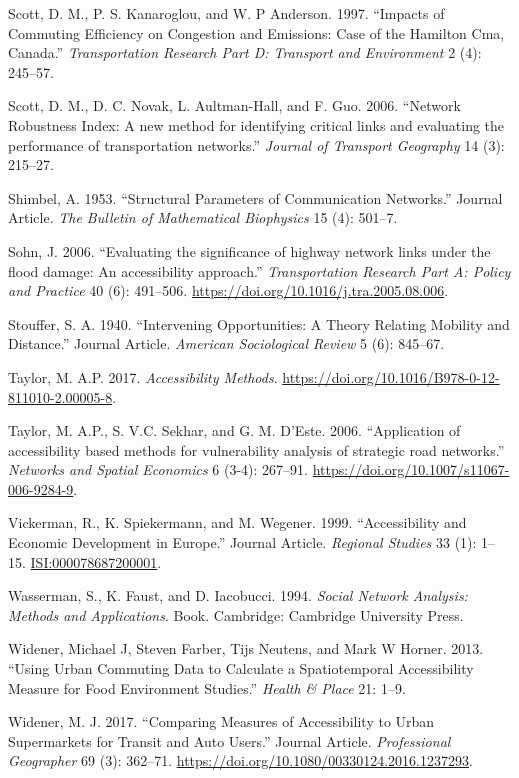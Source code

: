 \documentclass[]{elsarticle} %
\begin{document}
\leavevmode\hypertarget{ref-Scott1997impacts}{}%
Scott, D. M., P. S. Kanaroglou, and W. P Anderson. 1997. ``Impacts of
Commuting Efficiency on Congestion and Emissions: Case of the Hamilton
Cma, Canada.'' \emph{Transportation Research Part D: Transport and
Environment} 2 (4): 245--57.

\leavevmode\hypertarget{ref-Scott2006}{}%
Scott, D. M., D. C. Novak, L. Aultman-Hall, and F. Guo. 2006. ``Network
Robustness Index: A new method for identifying critical links and
evaluating the performance of transportation networks.'' \emph{Journal
of Transport Geography} 14 (3): 215--27.

\leavevmode\hypertarget{ref-Shimbel1953}{}%
Shimbel, A. 1953. ``Structural Parameters of Communication Networks.''
Journal Article. \emph{The Bulletin of Mathematical Biophysics} 15 (4):
501--7.

\leavevmode\hypertarget{ref-Sohn2006}{}%
Sohn, J. 2006. ``Evaluating the significance of highway network links
under the flood damage: An accessibility approach.''
\emph{Transportation Research Part A: Policy and Practice} 40 (6):
491--506. \url{https://doi.org/10.1016/j.tra.2005.08.006}.

\leavevmode\hypertarget{ref-Stouffer1940}{}%
Stouffer, S. A. 1940. ``Intervening Opportunities: A Theory Relating
Mobility and Distance.'' Journal Article. \emph{American Sociological
Review} 5 (6): 845--67.

\leavevmode\hypertarget{ref-Taylor2017}{}%
Taylor, M. A.P. 2017. \emph{Accessibility Methods}.
\url{https://doi.org/10.1016/B978-0-12-811010-2.00005-8}.

\leavevmode\hypertarget{ref-Taylor2006}{}%
Taylor, M. A.P., S. V.C. Sekhar, and G. M. D'Este. 2006. ``Application
of accessibility based methods for vulnerability analysis of strategic
road networks.'' \emph{Networks and Spatial Economics} 6 (3-4): 267--91.
\url{https://doi.org/10.1007/s11067-006-9284-9}.

\leavevmode\hypertarget{ref-Vickerman1999}{}%
Vickerman, R., K. Spiekermann, and M. Wegener. 1999. ``Accessibility and
Economic Development in Europe.'' Journal Article. \emph{Regional
Studies} 33 (1): 1--15. \url{ISI:000078687200001}.

\leavevmode\hypertarget{ref-Wasserman1994social}{}%
Wasserman, S., K. Faust, and D. Iacobucci. 1994. \emph{Social Network
Analysis: Methods and Applications}. Book. Cambridge: Cambridge
University Press.

\leavevmode\hypertarget{ref-widener2013using}{}%
Widener, Michael J, Steven Farber, Tijs Neutens, and Mark W Horner.
2013. ``Using Urban Commuting Data to Calculate a Spatiotemporal
Accessibility Measure for Food Environment Studies.'' \emph{Health \&
Place} 21: 1--9.

\leavevmode\hypertarget{ref-Widener2017}{}%
Widener, M. J. 2017. ``Comparing Measures of Accessibility to Urban
Supermarkets for Transit and Auto Users.'' Journal Article.
\emph{Professional Geographer} 69 (3): 362--71.
\url{https://doi.org/10.1080/00330124.2016.1237293}.
\end{document}
